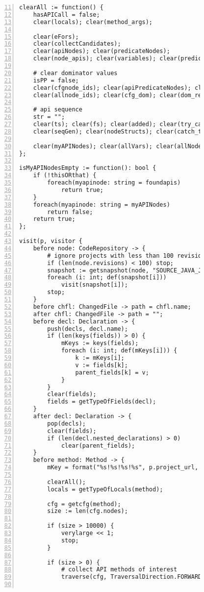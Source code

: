 \begin{figure}[ht!]
\begin{lstlisting}[numbers=left, tabsize=4, escapechar=@, caption={API Usage Mining Analysis},label={lst:aun-code}, firstline = 11, firstnumber = 11, lastline = 60]
clearAll := function() {
    hasAPICall = false;
    clear(locals); clear(method_args);
	    
	clear(eFors);
    clear(collectCandidates);
    clear(apiNodes); clear(predicateNodes); 
    clear(node_apis); clear(variables); clear(predicates);
	    
	# clear dominator values
	isPP = false;
    clear(cfgnode_ids); clear(apiPredicateNodes); clear(exits); clear(exitsT);
    clear(allnode_ids); clear(cfg_dom); clear(dom_result); clear(dom_more); clear(terminals);
	    
    # api sequence
    str = "";
    clear(ts); clear(fs); clear(added); clear(try_catch_finally); clear(catch_counts);
    clear(seqGen); clear(nodeStructs); clear(catch_types);
    
    clear(myAPINodes); clear(allVars); clear(allNodeIds); clear(hops); clear(foundapis);
};

isMyAPINodesEmpty := function(): bool {
    if (!thisORthat) {
        foreach(myapinode: string = foundapis)
            return true;
    }
    foreach(myapinode: string = myAPINodes)    
        return false;
    return true;
};

visit(p, visitor {
	before node: CodeRepository -> {
	    # ignore projects with less than 100 revisions
        if (len(node.revisions) < 100) stop;
		snapshot := getsnapshot(node, "SOURCE_JAVA_JLS");
		foreach (i: int; def(snapshot[i]))
			visit(snapshot[i]);
		stop;
	}
	before chfl: ChangedFile -> path = chfl.name;
	after chfl: ChangedFile -> path = "";
	before decl: Declaration -> {
	    push(decls, decl.name);
	    if (len(keys(fields)) > 0) {
	        mKeys := keys(fields);    
	        foreach (i: int; def(mKeys[i])) {
	        	k := mKeys[i];
	        	v := fields[k];
	            parent_fields[k] = v;
	        }
	    }
	    clear(fields);
	    fields = getTypeOfFields(decl);
	}
    after decl: Declaration -> {
        pop(decls);
        clear(fields);
        if (len(decl.nested_declarations) > 0)
            clear(parent_fields);
    }
	before method: Method -> {
	    mKey = format("%s!%s!%s!%s", p.project_url, path, peek(decls), method.name);
	    
        clearAll();
        locals = getTypeOfLocals(method);

	    cfg = getcfg(method);
	    size := len(cfg.nodes);
	    
	    if (size > 10000) {
		    verylarge << 1;
		    stop;
		}
		
		if (size > 0) {
		    # collect API methods of interest
		    traverse(cfg, TraversalDirection.FORWARD, TraversalKind.SHALLOW_ITERATIVE, collectCandidates);    
            

\end{lstlisting}
\end{figure}
